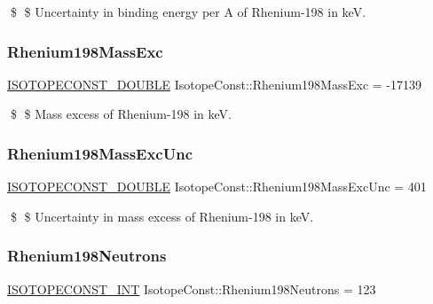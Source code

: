 \$ \$ Uncertainty in binding energy per A of Rhenium-\/198 in keV. \mbox{\label{group___isotope_const-_rhenium-_re198_ga5322c57094ff17c07c8cf65b6db27091}} 
\subsubsection{\texorpdfstring{Rhenium198\+Mass\+Exc}{Rhenium198MassExc}}
{\footnotesize\ttfamily \mbox{\hyperlink{group___isotope_const-_macros_ga8f45a7272ce02c0b4c65c44636ed719a}{I\+S\+O\+T\+O\+P\+E\+C\+O\+N\+S\+T\+\_\+\+D\+O\+U\+B\+LE}} Isotope\+Const\+::\+Rhenium198\+Mass\+Exc = -\/17139}

\$ \$ Mass excess of Rhenium-\/198 in keV. \mbox{\label{group___isotope_const-_rhenium-_re198_ga481a6977f514f7bee75e28ab4ac40d67}} 
\subsubsection{\texorpdfstring{Rhenium198\+Mass\+Exc\+Unc}{Rhenium198MassExcUnc}}
{\footnotesize\ttfamily \mbox{\hyperlink{group___isotope_const-_macros_ga8f45a7272ce02c0b4c65c44636ed719a}{I\+S\+O\+T\+O\+P\+E\+C\+O\+N\+S\+T\+\_\+\+D\+O\+U\+B\+LE}} Isotope\+Const\+::\+Rhenium198\+Mass\+Exc\+Unc = 401}

\$ \$ Uncertainty in mass excess of Rhenium-\/198 in keV. \mbox{\label{group___isotope_const-_rhenium-_re198_ga40eef5a9da39bd1c91dd3cf3871aac9e}} 
\subsubsection{\texorpdfstring{Rhenium198\+Neutrons}{Rhenium198Neutrons}}
{\footnotesize\ttfamily \mbox{\hyperlink{group___isotope_const-_macros_ga5f18360b3e99483a35c32d789e62621c}{I\+S\+O\+T\+O\+P\+E\+C\+O\+N\+S\+T\+\_\+\+I\+NT}} Isotope\+Const\+::\+Rhenium198\+Neutrons = 123}

